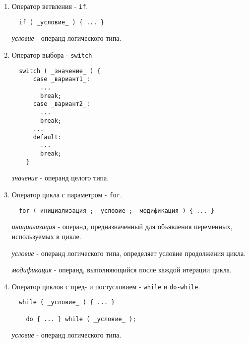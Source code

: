 \begin{enumerate}
\def\labelenumi{\arabic{enumi})}
\item
  Оператор ветвления - \texttt{if}.

\begin{Verbatim}
  if ( _условие_ ) { ... }
\end{Verbatim}

  \emph{условие} - операнд логического типа.
\item
  Оператор выбора - \texttt{switch}

\begin{Verbatim}
  switch ( _значение_ ) {
      case _вариант1_:
        ...
        break;
      case _вариант2_:
        ...
        break;
      ...
      default:
        ...
        break;
    }
\end{Verbatim}

  \emph{значение} - операнд целого типа.
\item
  Оператор цикла с параметром - \texttt{for}.

\begin{Verbatim}
  for (_инициализация_; _условие_; _модификация_) { ... }
\end{Verbatim}

  \emph{инициализация} - операнд, предназначенный для объявления
  переменных, используемых в цикле.

  \emph{условие} - операнд логического типа, определяет условие
  продолжения цикла.

  \emph{модификация} - операнд, выполняющийся после каждой итерации
  цикла.
\item
  Оператор циклов с пред- и постусловием - \texttt{while} и
  \texttt{do-while}.

\begin{Verbatim}
  while ( _условие_ ) { ... }

    do { ... } while ( _условие_ );
\end{Verbatim}

  \emph{условие} - операнд логического типа.
\end{enumerate}
